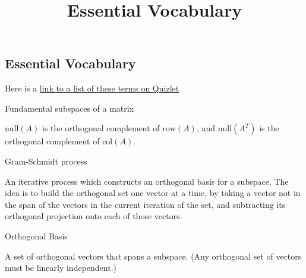 \documentclass{ximera}
\title{Essential Vocabulary} \license{CC BY-NC-SA 4.0}
\begin{document}
\begin{abstract}
\end{abstract}
\maketitle


\begin{onlineOnly}
\section*{Essential Vocabulary}
Here is a  \href{https://quizlet.com/906041657/chapter-9-vocabulary-flash-cards/?i=y06sd&x=1jqt}{link to a list of these terms on Quizlet}
\end{onlineOnly}


Fundamental subspaces of a matrix
\begin{expandable}
    $\mbox{null}(A)$ is the orthogonal complement of $\mbox{row}(A)$, and $\mbox{null}(A^T)$ is the orthogonal complement of $\mbox{col}(A)$.
\end{expandable}


Gram-Schmidt process
\begin{expandable}
    An iterative process which constructs an orthogonal basis for a subspace. The idea is to build the orthogonal set one vector at a time, by taking a vector not in the span of the vectors in the current iteration of the set, and subtracting its orthogonal projection onto each of those vectors.
\end{expandable}


Orthogonal Basis
\begin{expandable}
    A set of orthogonal vectors that spans a subspace. (Any orthogonal set of vectors must be linearly independent.)
\end{expandable}
\end{document}
